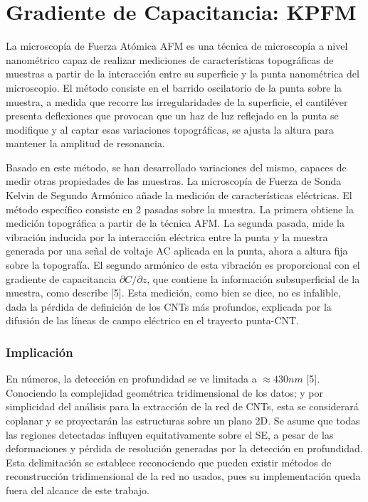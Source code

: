 \section{Gradiente de Capacitancia: KPFM}
\label{sec:kpfm}

La microscopía de Fuerza Atómica AFM es una técnica de microscopía a nivel nanométrico capaz de realizar mediciones de características topográficas de muestras a partir de la interacción entre su superficie y la punta nanométrica del microscopio. El método consiste en el barrido oscilatorio de la punta sobre la muestra, a medida que recorre las irregularidades de la superficie, el cantiléver presenta deflexiones que provocan que un haz de luz reflejado en la punta se modifique y al captar esas variaciones topográficas, se ajusta la altura para mantener la amplitud de resonancia.

Basado en este método, se han desarrollado variaciones del mismo, capaces de medir otras propiedades de las muestras. La microscopía de Fuerza de Sonda Kelvin de Segundo Armónico añade la medición de características eléctricas. El método específico consiste en 2 pasadas sobre la muestra. La primera obtiene la medición topográfica a partir de la técnica AFM. La segunda pasada, mide la vibración inducida por la interacción eléctrica entre la punta y la muestra generada por una señal de voltaje AC aplicada en la punta, ahora a altura fija sobre la topografía. El segundo armónico de esta vibración es proporcional con el gradiente de capacitancia $\partial C/\partial z$, que contiene la información subsuperficial de la muestra, como describe [5]. Esta medición, como bien se dice, no es infalible, dada la pérdida de definición de los CNTs más profundos, explicada por la difusión de las líneas de campo eléctrico en el trayecto punta-CNT.

\subsubsection{Implicación}
En números, la detección en profundidad se ve limitada a $\approx 430 nm$ [5]. Conociendo la complejidad geométrica tridimensional de los datos; y por simplicidad del análisis para la extracción de la red de CNTs, esta se considerará coplanar y se proyectarán las estructuras sobre un plano 2D. Se asume que todas las regiones detectadas influyen equitativamente sobre el SE, a pesar de las deformaciones y pérdida de resolución generadas por la detección en profundidad. Esta delimitación se establece reconociendo que pueden existir métodos de reconstrucción tridimensional de la red no usados, pues su implementación queda fuera del alcance de este trabajo.

